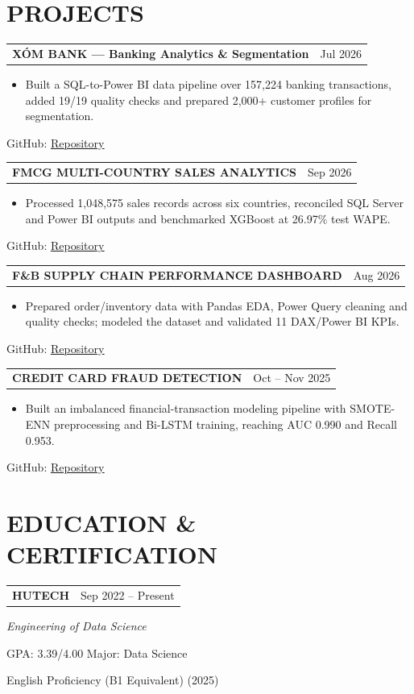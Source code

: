 \documentclass[10pt,letterpaper]{article}
\makeatletter
\newcommand{\cvsection}[2]{\section*{\faIcon{#1}\hspace{0.45em}#2}}
\newcommand{\cvlink}[2]{\href{#1}{\underline{#2}}}
\newcommand{\projectentry}[4]{%
  \begin{tabularx}{\textwidth}{@{}X>{\raggedleft\arraybackslash}p{1.52in}@{}}
    \textbf{#1} & \normalsize #2 \\
  \end{tabularx}\par
  \begin{itemize}[leftmargin=1.75em,itemsep=0em,topsep=0.08em,parsep=0em,partopsep=0em]
    \item \small #3
  \end{itemize}
  \small\hspace{1.15em}GitHub: \cvlink{#4}{Repository}\par
}
\makeatother
\begin{document}
\cvsection{briefcase}{PROJECTS}
\projectentry{XÓM BANK --- Banking Analytics \& Segmentation}{Jul 2026}{Built a SQL-to-Power BI data pipeline over 157,224 banking transactions, added 19/19 quality checks and prepared 2,000+ customer profiles for segmentation.}{https://github.com/lehoanggiavi/Banking}
\vspace{0.16em}
\projectentry{FMCG MULTI-COUNTRY SALES ANALYTICS}{Sep 2026}{Processed 1,048,575 sales records across six countries, reconciled SQL Server and Power BI outputs and benchmarked XGBoost at 26.97\% test WAPE.}{https://github.com/lehoanggiavi/FMCGMultiCountrySalesDataset}
\vspace{0.16em}
\projectentry{F\&B SUPPLY CHAIN PERFORMANCE DASHBOARD}{Aug 2026}{Prepared order/inventory data with Pandas EDA, Power Query cleaning and quality checks; modeled the dataset and validated 11 DAX/Power BI KPIs.}{https://github.com/lehoanggiavi/F-B-Supply-Chain}
\vspace{0.16em}
\projectentry{CREDIT CARD FRAUD DETECTION}{Oct -- Nov 2025}{Built an imbalanced financial-transaction modeling pipeline with SMOTE-ENN preprocessing and Bi-LSTM training, reaching AUC 0.990 and Recall 0.953.}{https://github.com/lehoanggiavi/ccfd}

\cvsection{graduation-cap}{EDUCATION \& CERTIFICATION}
\begin{tabularx}{\textwidth}{@{}X>{\raggedleft\arraybackslash}p{1.52in}@{}}
  \textbf{HUTECH} & \normalsize Sep 2022 -- Present \\
\end{tabularx}\par
\small\textit{Engineering of Data Science}\par
\small GPA: 3.39/4.00 \quad\textbullet\quad Major: Data Science\par
\small English Proficiency (B1 Equivalent) (2025)
\end{document}
